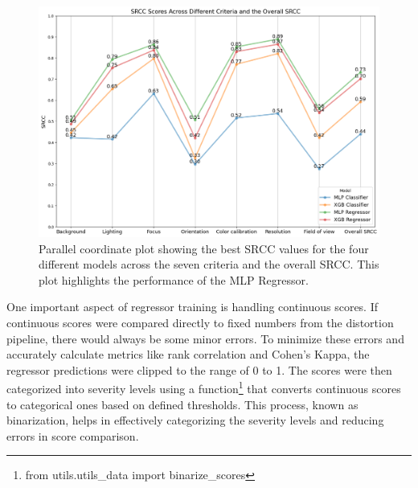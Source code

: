 \begin{figure}[ht]
    \centering
    \includegraphics[keepaspectratio,width=15cm]{img/Model_SRCC.png}
    \caption{Parallel coordinate plot showing the best SRCC values for the four different models across the seven criteria and the overall SRCC. This plot highlights the performance of the MLP Regressor.}
    \label{fig:ModelSRCC}
\end{figure}
\vspace{\baselineskip}
\noindent
One important aspect of regressor training is handling continuous scores. If continuous scores were compared directly to fixed numbers from the distortion pipeline, there would always be some minor errors. To minimize these errors and accurately calculate metrics like rank correlation and Cohen's Kappa, the regressor predictions were clipped to the range of 0 to 1. The scores were then categorized into severity levels using a function\footnote{from utils.utils\_data import binarize\_scores} that converts continuous scores to categorical ones based on defined thresholds. This process, known as binarization, helps in effectively categorizing the severity levels and reducing errors in score comparison. \par

